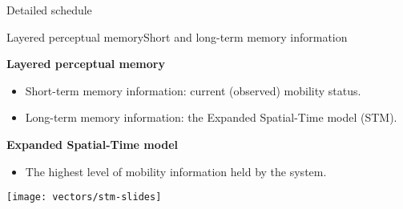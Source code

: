 \begin{frame}[noframenumbering]{Detailed schedule}
\begin{table}
\centering
{}
\caption{Schedule of required activities}
\end{table}
\end{frame}


\begin{frame}[noframenumbering]{Layered perceptual memory}{Short and long-term memory information}
\vspace{-0.25cm}
\small
\begin{block}{\small \textbf{Layered perceptual memory}}
\begin{itemize}
    \item Short-term memory information: current (observed) mobility status.
    \item Long-term memory information: the Expanded Spatial-Time model (STM).
\end{itemize}
\end{block}

\begin{block}{\small \textbf{Expanded Spatial-Time model}}
\begin{itemize}
  \item The highest level of mobility information held by the system.
\end{itemize}
{
  \centering
  \texttt{[image: vectors/stm-slides]}
\par }
\end{block}
\end{frame}

